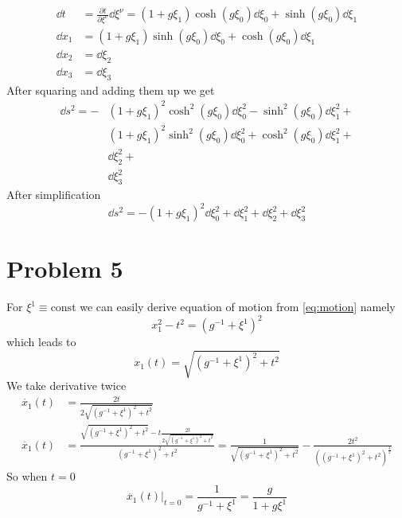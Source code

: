 \begin{align}
	\dd t   & = \frac{\partial t}{\partial \xi^\nu}\dd \xi^\nu =
	(1 + g\xi_1)\cosh(g\xi_0) \dd \xi_0 + \sinh(g\xi_0) \dd \xi_1             \\
	\dd x_1 & = (1 + g\xi_1)\sinh(g\xi_0) \dd \xi_0 + \cosh(g\xi_0) \dd \xi_1 \\
	\dd x_2 & = \dd \xi_2                                                     \\
	\dd x_3 & = \dd \xi_3
\end{align}
After squaring and adding them up we get
%
\begin{align}
	\dd s^2 =  - & (1 + g\xi_1)^2\cosh^2(g\xi_0) \dd \xi_0^2 - \sinh^2(g\xi_0) \dd \xi_1^2 +           \\
	             & (1 + g\xi_1)^2\sinh^2(g\xi_0) \dd \xi_0^2 + \cosh^2(g\xi_0) \dd \xi_1^2 + \nonumber \\
	             & \dd \xi_2^2 +                                                             \nonumber \\
	             & \dd \xi_3^2 \nonumber
\end{align}
After simplification
\begin{equation}
	\boxed{\dd s^2 = -(1+g\xi_1)^2\dd\xi_0^2 + \dd\xi_1^2 + \dd\xi_2^2 + \dd\xi_3^2}
	\label{eq:action}
\end{equation}

\section*{Problem 5}

For $\xi^1 \equiv \text{const}$ we can easily derive equation of motion from
\autoref{eq:motion} namely
%
\begin{equation}
	x_1^2 - t^2 = (g^{-1}+\xi^1)^2
\end{equation}
%
which leads to
%
\begin{equation}
	x_1(t) = \sqrt{(g^{-1}+\xi^1)^2 + t^2}
	\label{eq:sqrt}
\end{equation}
%
We take derivative twice
%
\begin{align}
	\dot{x_1}(t)  & = \frac{2t}{2\sqrt{(g^{-1}+\xi^1)^2 + t^2}} \\
	\ddot{x_1}(t) & =
	\frac{\sqrt{(g^{-1}+\xi^1)^2 + t^2} -
		t \frac{2t}{2\sqrt{(g^{-1}+\xi^1)^2 + t^2}}}{(g^{-1}+\xi^1)^2 + t^2} =
	\frac{1}{\sqrt{(g^{-1}+\xi^1)^2 + t^2}} -
	\frac{2t^2}{((g^{-1}+\xi^1)^2 + t^2)^{\frac{3}{2}}}
\end{align}
%
So when $t=0$
%
\begin{equation}
	\boxed{\ddot{x_1}(t)\Big|_{t=0} = \frac{1}{g^{-1}+\xi^1} = \frac{g}{1+g\xi^1}}
\end{equation}


